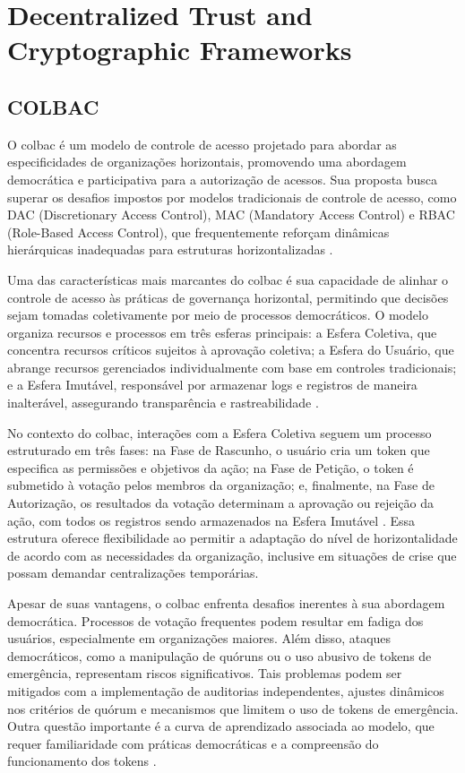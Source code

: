 \section{Decentralized Trust and Cryptographic Frameworks}
\label{sec:decentralized_cryptographic}

\subsection{COLBAC}
\label{subsec:colbac}

O \gls{colbac} é um modelo de controle de
acesso projetado para abordar as especificidades de organizações
horizontais, promovendo uma abordagem democrática e participativa para
a autorização de acessos. Sua proposta busca superar os desafios
impostos por modelos tradicionais de controle de acesso, como DAC
(Discretionary Access Control), MAC (Mandatory Access Control) e RBAC
(Role-Based Access Control), que frequentemente reforçam dinâmicas
hierárquicas inadequadas para estruturas horizontalizadas
\cite{Colbac}.

Uma das características mais marcantes do \gls{colbac} é sua capacidade de
alinhar o controle de acesso às práticas de governança horizontal,
permitindo que decisões sejam tomadas coletivamente por meio de
processos democráticos. O modelo organiza recursos e processos em três
esferas principais: a Esfera Coletiva, que concentra recursos críticos
sujeitos à aprovação coletiva; a Esfera do Usuário, que abrange
recursos gerenciados individualmente com base em controles
tradicionais; e a Esfera Imutável, responsável por armazenar logs e
registros de maneira inalterável, assegurando transparência e
rastreabilidade \cite{Colbac}.

No contexto do \gls{colbac}, interações com a Esfera Coletiva seguem um
processo estruturado em três fases: na Fase de Rascunho, o usuário
cria um token que especifica as permissões e objetivos da ação; na
Fase de Petição, o token é submetido à votação pelos membros da
organização; e, finalmente, na Fase de Autorização, os resultados da
votação determinam a aprovação ou rejeição da ação, com todos os
registros sendo armazenados na Esfera Imutável \cite{Colbac}. Essa
estrutura oferece flexibilidade ao permitir a adaptação do nível de
horizontalidade de acordo com as necessidades da organização,
inclusive em situações de crise que possam demandar centralizações
temporárias.

Apesar de suas vantagens, o \gls{colbac} enfrenta desafios inerentes à sua
abordagem democrática. Processos de votação frequentes podem resultar
em fadiga dos usuários, especialmente em organizações maiores. Além
disso, ataques democráticos, como a manipulação de quóruns ou o uso
abusivo de tokens de emergência, representam riscos significativos.
Tais problemas podem ser mitigados com a implementação de auditorias
independentes, ajustes dinâmicos nos critérios de quórum e mecanismos
que limitem o uso de tokens de emergência. Outra questão importante é
a curva de aprendizado associada ao modelo, que requer familiaridade
com práticas democráticas e a compreensão do funcionamento dos tokens
\cite{Colbac}.


